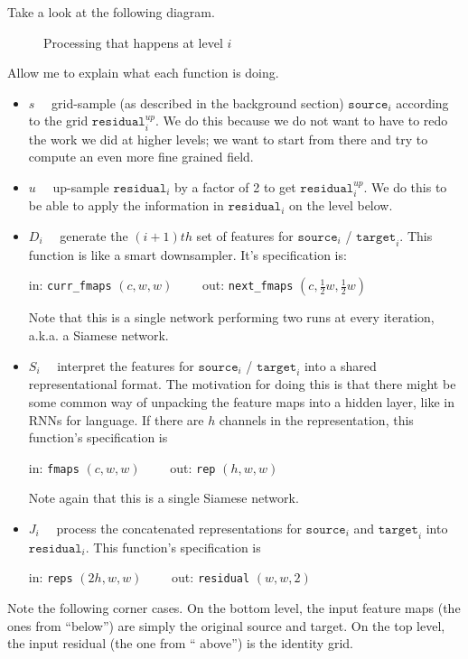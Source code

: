 \documentclass[12pt,a4paper]{article}
\begin{document}
Take a look at the following diagram.

\begin{figure}[H]%
    \caption{Processing that happens at level $i$}%
    \label{fig:example}%
\end{figure}

Allow me to explain what each function is doing.\begin{itemize}
\item $s \quad$ grid-sample (as described in the background section) $\texttt{source}_i$ according to the grid $\texttt{residual}^{up}_i$. We do this because we do not want to have to redo the work we did at higher levels; we want to start from there and try to compute an even more fine grained field.
\item $u \quad$ up-sample $\texttt{residual}_i$ by a factor of 2 to get $\texttt{residual}^{up}_i$. We do this to be able to apply the information in $\texttt{residual}_i$ on the level below. 
\item $D_i \quad$ generate the $(i+1)th$ set of features for $\texttt{source}_i$ / $\texttt{target}_i$. This function is like a smart downsampler. It's specification is:

\indent in: {\tt curr\_fmaps} $(c, w, w) \qquad$ out: {\tt next\_fmaps} $(c, \frac{1}{2}w, \frac{1}{2}w)$

Note that this is a single network performing two runs at every iteration, a.k.a. a Siamese network.
\item $S_i \quad$ interpret the features for $\texttt{source}_i$ / $\texttt{target}_i$ into a shared representational format. The motivation for doing this is that there might be some common way of unpacking the feature maps into a hidden layer, like in RNNs for language. If there are $h$ channels in the representation, this function's specification is

\indent in: {\tt fmaps} $(c, w, w) \qquad$ out: {\tt rep} $(h, w, w)$

Note again that this is a single Siamese network.
\item $J_i \quad$ process the concatenated representations for $\texttt{source}_i$ and $\texttt{target}_i$ into $\texttt{residual}_i$. This function's specification is

\indent in: {\tt reps} $(2h, w, w) \qquad$ out: {\tt residual} $(w, w, 2)$
\end{itemize}

Note the following corner cases. On the bottom level, the input feature maps (the ones from ``below'') are simply the original source and target. On the top level, the input residual (the one from `` above'') is the identity grid.
\end{document}
